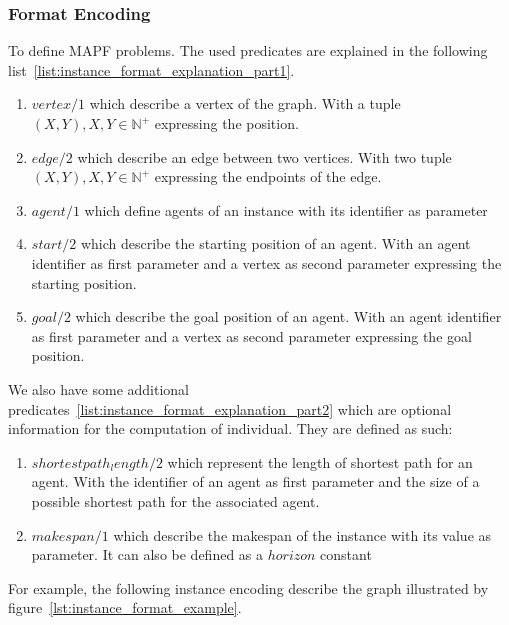 \subsubsection{Format Encoding}

To define MAPF problems. The used predicates are explained in the following list~\ref{list:instance_format_explanation_part1}.

\begin{enumerate}
    \label{list:instance_format_explanation_part1}
    \item \(vertex/1\) which describe a vertex of the graph. With a tuple \((X,Y), X,Y \in \mathbb{N}^+\) expressing the position.
    \item \(edge/2\) which describe an edge between two vertices. With two tuple \((X,Y), X,Y \in \mathbb{N}^+\) expressing the endpoints of the edge.
    \item \(agent/1\) which define agents of an instance with its identifier as parameter
    \item \(start/2\) which describe the starting position of an agent. With an agent identifier as first parameter and a vertex as second parameter expressing the starting position.
    \item \(goal/2\) which describe the goal position of an agent. With an agent identifier as first parameter and a vertex as second parameter expressing the goal position. 
\end{enumerate}

We also have some additional predicates~\ref{list:instance_format_explanation_part2} which are optional information for the computation of individual. They are defined as such:

\begin{enumerate}
    \label{list:instance_format_explanation_part2}
    \item \(shortestpath_length/2\) which represent the length of shortest path for an agent. With the identifier of an agent as first parameter and the size of a possible shortest path for the associated agent.
    \item \(makespan/1\) which describe the makespan of the instance with its value as parameter. It can also be defined as a \(horizon\) constant
\end{enumerate}

For example, the following instance encoding describe the graph illustrated by figure~\ref{lst:instance_format_example}.

